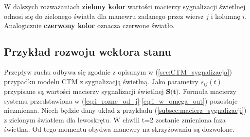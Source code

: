 \documentclass[12pt]{book}
\theoremstyle{plain}
\newcommand{\myref}[1]{(\ref{#1})}
\begin{document}
W dalszych rozważaniach {\color[rgb]{0,.70,0} \textbf{zielony kolor}} wartości macierzy sygnalizacji świetlnej odnosi się do zielonego światła dla manewru zadanego przez wiersz $j$ i kolumnę $i$. Analogicznie 
{\color[rgb]{.70,0,0} \textbf{czerwony kolor}} oznacza czerwone światło.
\subsection{Przykład rozwoju wektora stanu} \label{sec:rozwoj_sieci_sygnalizcja_przypadek}
Przepływ ruchu odbywa się zgodnie z opisanym w \myref{sec:CTM_sygnalizacja} przypadku modelu CTM z sygnalizacją świetlną. Jako parametry $s_{ij}(t)$ przypisane są wartości macierzy sygnalizacji świetlnej $\textbf{S(t)}$. Formuła macierzy systemu przedstawiona w 
(\ref{eq:i_rozne_od_j}-\ref{eq:i_w_omega_out}) pozostaje niezmienna. \newline
Niech będzie dany układ z przykładu \myref{subsec:macierz_sygnalizacji} z zielonym światłem dla lewoskrętu. W chwili t=2 zostanie zmieniona faza świetlna. Od tego momentu obydwa manewry na skrzyżowaniu są dozwolone.  
\def \xzero{\begin{bmatrix}
		9 \\ 4 \\ 3 \\ 0 \\ 1 \\ 5
\end{bmatrix}}
\def \xI{\begin{bmatrix}
		0 \\ 12 \\ 1 \\ 3 \\ 0 \\ 1
\end{bmatrix}}
\def \xII{\begin{bmatrix}
		0 \\ 9 \\ 3 \\ 1 \\ 0 \\ 0
\end{bmatrix}}
\def \xIII{\begin{bmatrix}
		0 \\ 0 \\ 2 \frac{1}{4} \\ 3 \\ 7 \frac{3}{4} \\ 0
\end{bmatrix}}
\end{document}
